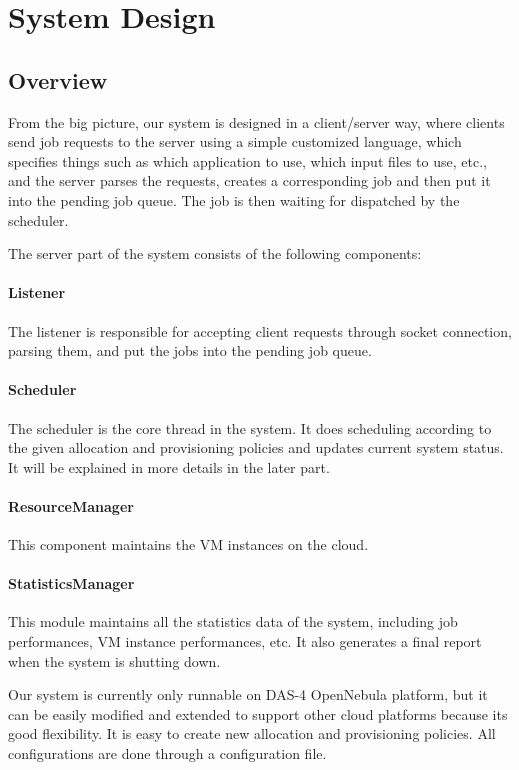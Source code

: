 \section{System Design}

\subsection{Overview}
From the big picture, our system is designed in a client/server way, where clients send job requests to the server using a simple customized language, which specifies things such as which application to use, which input files to use, etc., and the server parses the requests, creates a corresponding job and then put it into the pending job queue. The job is then waiting for dispatched by the scheduler.

The server part of the system consists of the following components:

\paragraph{Listener} The listener is responsible for accepting client requests through socket connection, parsing them, and put the jobs into the pending job queue.
\paragraph{Scheduler} The scheduler is the core thread in the system. It does scheduling according to the given allocation and provisioning policies and updates current system status. It will be explained in more details in the later part.
\paragraph{ResourceManager} This component maintains the VM instances on the cloud.
\paragraph{StatisticsManager} This module maintains all the statistics data of the system, including job performances, VM instance performances, etc. It also generates a final report when the system is shutting down.

Our system is currently only runnable on DAS-4 OpenNebula platform, but it can be easily modified and extended to support other cloud platforms because its good flexibility. It is easy to create new allocation and provisioning policies. All configurations are done through a configuration file.


